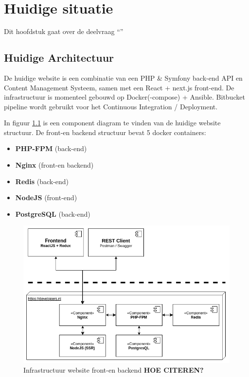 \chapter{Huidige situatie}

\label{Chapter4}

Dit hoofdstuk gaat over de deelvraag \enquote{\deelhuidig}

\section{Huidige Architectuur}
De huidige website is een combinatie van een PHP \& Symfony back-end API en Content Management Systeem, samen met een React + next.js front-end. De infrastructuur is momenteel gebouwd op Docker(-compose) + Ansible. Bitbucket pipeline wordt gebruikt voor het Continuous Integration / Deployment. 

In figuur \ref{fig:infra} is een component diagram te vinden van de huidige website structuur. De front-en backend structuur bevat 5 docker containers:
\begin{itemize}
	\item \textbf{PHP-FPM} (back-end)
	\item \textbf{Nginx} (front-en backend)
	\item \textbf{Redis} (back-end)
	\item \textbf{NodeJS} (front-end)
	\item \textbf{PostgreSQL} (back-end)
\end{itemize}

\begin{figure}
	\centering
	\includegraphics[width=13cm]{Figures/Infrastructure}
	\decoRule
	\caption[Infrastructuur]{Infrastructuur website front-en backend \textbf{HOE CITEREN?}}
	\label{fig:infra}
\end{figure}

